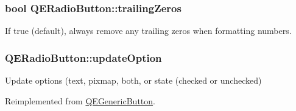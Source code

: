 \hypertarget{classQERadioButton_a372817b95d22b60e639a7857c6ddf621}{
\subsubsection[{trailingZeros}]{\setlength{\rightskip}{0pt plus 5cm}bool QERadioButton::trailingZeros}}
\label{classQERadioButton_a372817b95d22b60e639a7857c6ddf621}
If true (default), always remove any trailing zeros when formatting numbers. \hypertarget{classQERadioButton_a7c268e3cae168d0c28c48569f274393d}{
\subsubsection[{updateOption}]{ QERadioButton::updateOption}}
\label{classQERadioButton_a7c268e3cae168d0c28c48569f274393d}
Update options (text, pixmap, both, or state (checked or unchecked) 

Reimplemented from \hyperlink{classQEGenericButton}{QEGenericButton}.

